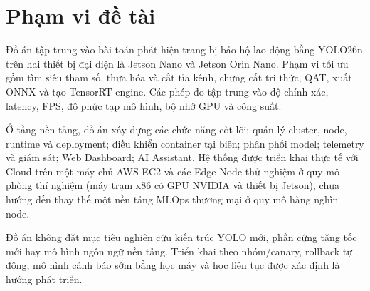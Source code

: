 \section{Phạm vi đề tài}

Đồ án tập trung vào bài toán phát hiện trang bị bảo hộ lao động bằng YOLO26n
trên hai thiết bị đại diện là Jetson Nano và Jetson Orin Nano. Phạm vi tối ưu gồm
tìm siêu tham số, thưa hóa và cắt tỉa kênh, chưng cất tri thức, QAT, xuất ONNX
và tạo TensorRT engine. Các phép đo tập trung vào độ chính xác, latency, FPS, độ
phức tạp mô hình, bộ nhớ GPU và công suất.

Ở tầng nền tảng, đồ án xây dựng các chức năng cốt lõi: quản lý cluster, node,
runtime và deployment; điều khiển container tại biên; phân phối model; telemetry
và giám sát; Web Dashboard; AI Assistant. Hệ thống được triển khai thực tế với
Cloud trên một máy chủ AWS EC2 và các Edge Node thử nghiệm ở quy mô phòng thí
nghiệm (máy trạm x86 có GPU NVIDIA và thiết bị Jetson), chưa hướng đến thay thế
một nền tảng MLOps thương mại ở quy mô hàng nghìn node.

Đồ án không đặt mục tiêu nghiên cứu kiến trúc YOLO mới, phần cứng tăng tốc mới
hay mô hình ngôn ngữ nền tảng. Triển khai theo nhóm/canary, rollback tự động, mô
hình cảnh báo sớm bằng học máy và học liên tục được xác định là hướng phát triển.
